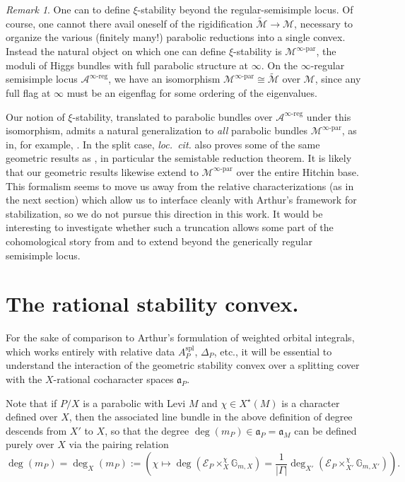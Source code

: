 \documentclass[openany]{amsbook}
\theoremstyle{definition}
\theoremstyle{remark}
\newtheorem{remark}[theorem]{Remark}
\numberwithin{equation}{section}
\newcommand{\G}{\mathbb{G}}
\newcommand{\cA}{\mathcal{A}}
\newcommand{\cM}{\mathcal{M}}
\newcommand{\cE}{\mathcal{E}}
\renewcommand{\-}{\operatorname{-}}
\renewcommand{\a}{\mathfrak{a}}
\newcommand{\ctM}{\widetilde{\cM}}
\newcommand{\spl}{\mathrm{spl}}
\begin{document}
\begin{remark}\label{rmk.xi.stab.parabolic.bundles}
    One can to define $\xi$-stability beyond the regular-semisimple locus. Of course, one cannot there avail oneself of the rigidification $\ctM \to \cM$, necessary to organize the various (finitely many!) parabolic reductions into a single convex. Instead the natural object on which one can define $\xi$-stability is $\cM^{\infty\text{-par}}$, the moduli of Higgs bundles with full parabolic structure at $\infty$. On the $\infty$-regular semisimple locus $\cA^{\infty\text{-reg}}$, we have an isomorphism $\cM^{\infty\text{-par}} \cong \ctM$ over $\cM$, since any full flag at $\infty$ must be an eigenflag for some ordering of the eigenvalues. 
    
    Our notion of $\xi$-stability, translated to parabolic bundles over $\cA^{\infty\text{-reg}}$ under this isomorphism, admits a natural generalization to \emph{all} parabolic bundles $\cM^{\infty\text{-par}}$, as in, for example, \cite{heinlothschmitt}. In the split case, \textit{loc.\ cit.} also proves some of the same geometric results as \cite{CLI}, in particular the semistable reduction theorem. It is likely that our geometric results likewise extend to $\cM^{\infty\text{-par}}$ over the entire Hitchin base. This formalism seems to move us away from the relative characterizations (as in the next section) which allow us to interface cleanly with Arthur's framework for stabilization, so we do not pursue this direction in this work. It would be interesting to investigate whether such a truncation allows some part of the cohomological story from \cite{zhiweithesis} and \cite{ngofl} to extend beyond the generically regular semisimple locus. 
\end{remark}


\section{The rational stability convex.} For the sake of comparison to Arthur's formulation of weighted orbital integrals, which works entirely with relative data $A_P^{\spl}$, $\Delta_P$, etc., it will be essential to understand the interaction of the geometric stability convex over a splitting cover with the $X$-rational cocharacter spaces $\a_P$.

Note that if $P/X$ is a parabolic with Levi $M$ and $\chi \in X^\star(M)$ is a character defined over $X$, then the associated line bundle in the above definition of degree descends from $X'$ to $X$, so that the degree $\deg(m_P) \in \a_P = \a_M$ can be defined purely over $X$ via the pairing relation
$$
    \deg(m_P) = \deg_X(m_P) := \left( \chi \mapsto  \deg(\cE_P \times_X^\chi \G_{m,X}) = \frac{1}{|\Gamma|} \deg_{X'}(\cE_P \times_{X'}^{\chi} \G_{m,X'})\right).
$$
\end{document}
